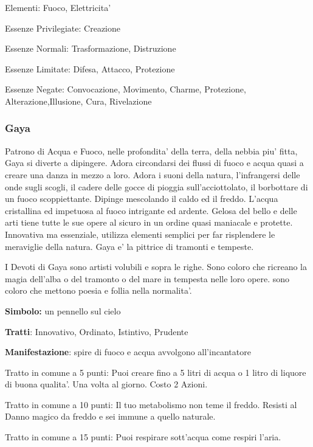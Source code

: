 \documentclass[a4paper,11pt,twoside,openany]{dndbook}
\begin{document}
{\bigskip

Elementi: Fuoco, Elettricita'

\bigskip

Essenze Privilegiate: Creazione

Essenze Normali: Trasformazione, Distruzione

Essenze Limitate: Difesa, Attacco, Protezione

Essenze Negate: Convocazione, Movimento, Charme, Protezione, Alterazione,Illusione, Cura, Rivelazione

\subsubsection{Gaya}

\label{gaya}

Patrono di Acqua e Fuoco, nelle profondita' della terra, della nebbia piu' fitta, Gaya si diverte a dipingere. Adora circondarsi dei flussi di fuoco e acqua quasi a creare una danza in mezzo a loro. Adora i suoni della natura, l'infrangersi delle onde sugli scogli, il cadere delle gocce di pioggia sull'acciottolato, il borbottare di un fuoco scoppiettante. Dipinge mescolando il caldo ed il freddo. L'acqua cristallina ed impetuosa al fuoco intrigante ed ardente. Gelosa del bello e delle arti tiene tutte le sue opere al sicuro in un ordine quasi maniacale e protette. Innovativa ma essenziale, utilizza elementi semplici per far risplendere le meraviglie della natura. Gaya e' la pittrice di tramonti e tempeste.

I Devoti di Gaya sono artisti volubili e sopra le righe. Sono coloro che ricreano la magia dell'alba o del tramonto o del mare in tempesta nelle loro opere. sono coloro che mettono poesia e follia nella normalita'. 

\textbf{Simbolo:} un pennello sul cielo

\textbf{Tratti}: Innovativo, Ordinato, Istintivo, Prudente

\textbf{Manifestazione}: spire di fuoco e acqua avvolgono all'incantatore

\bigskip

Tratto in comune a 5 punti: Puoi creare fino a 5 litri di acqua o 1 litro di liquore di buona qualita'. Una volta al giorno. Costo 2 Azioni.

Tratto in comune a 10 punti: Il tuo metabolismo non teme il freddo. Resisti al Danno magico da freddo e sei immune a quello naturale.

Tratto in comune a 15 punti: Puoi respirare sott'acqua come respiri l'aria.

}
\end{document}
